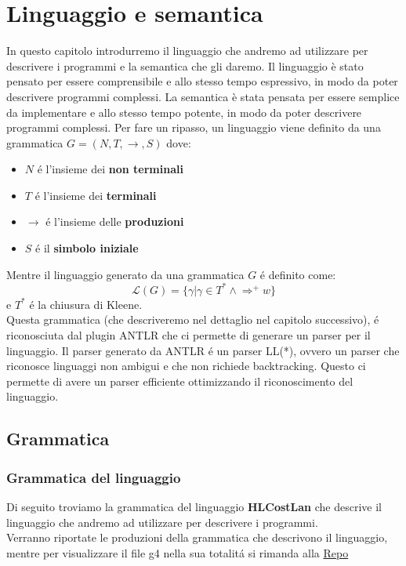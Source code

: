 \documentclass[../../main.tex]{subfiles}
\begin{document}
\chapter{Linguaggio e semantica}

In questo capitolo introdurremo il linguaggio che andremo ad utilizzare per descrivere i programmi e la semantica che gli daremo. Il linguaggio è stato pensato per essere comprensibile e allo stesso tempo espressivo, in modo da poter descrivere programmi complessi. La semantica è stata pensata per essere semplice da implementare e allo stesso tempo potente, in modo da poter descrivere programmi complessi.
Per fare un ripasso, un linguaggio viene definito da una grammatica $G = (N, T ,\rightarrow, S)$ dove:
\begin{itemize}
    \item $N$ é l'insieme dei \textbf{non terminali}
    \item $T$ é l'insieme dei \textbf{terminali}
    \item $\rightarrow$ é l'insieme delle \textbf{produzioni}
    \item $S$ é il \textbf{simbolo iniziale}
\end{itemize}

Mentre il linguaggio generato da una grammatica $G$ é definito come:
\begin{equation}
    \mathcal{L}(G) = \{\gamma | \gamma \in T^* \land \Rightarrow^+ w\}
\end{equation}
e $T^*$ é la chiusura di Kleene.\\
Questa grammatica (che descriveremo nel dettaglio nel capitolo successivo), é riconosciuta dal plugin ANTLR che ci permette di generare un parser per il linguaggio. Il parser generato da ANTLR é un parser LL(*), ovvero un parser che riconosce linguaggi non ambigui e che non richiede backtracking. Questo ci permette di avere un parser efficiente ottimizzando il riconoscimento del linguaggio.

\section{Grammatica}

\subsection{Grammatica del linguaggio}
Di seguito troviamo la grammatica del linguaggio \textbf{HLCostLan} che descrive il linguaggio che andremo ad utilizzare per descrivere i programmi.\\
Verranno riportate le produzioni della grammatica che descrivono il linguaggio, mentre per visualizzare il file g4 nella sua totalitá si rimanda alla \href{https://github.com/minosse99/CostCompiler/blob/master/src/HLCostLan.g4}{Repo}
\label{sec:grammatica}
\end{document}
